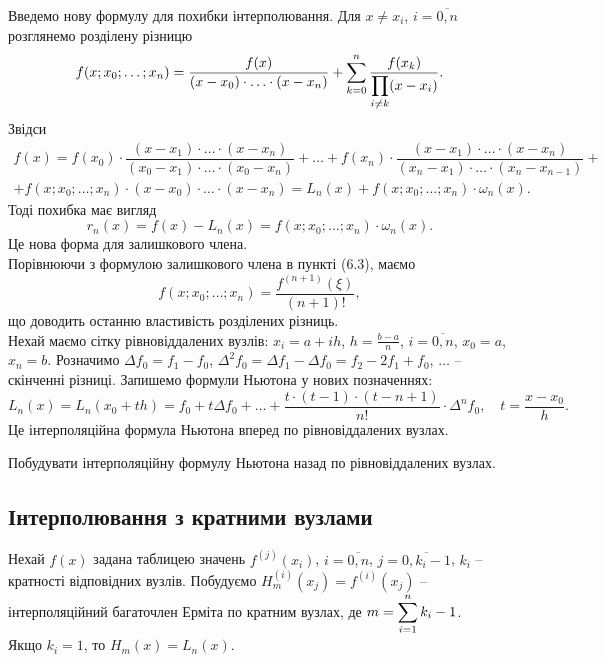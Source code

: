 Введемо нову формулу для похибки інтерполювання. Для $x \ne x_i$, $i = \overline{0,n}$ розглянемо розділену різницю
\[ f(x;x_0;\ldots;x_n) = \dfrac{f(x)}{(x-x_0)\cdot\ldots\cdot(x-x_n)} + \displaystyle\sum\limits_{k=0}^n \dfrac{f(x_k)}{\displaystyle\prod\limits_{i\ne k}(x-x_i)}.\]
Звідси
\begin{multline*}
    f(x) = f(x_0) \cdot \dfrac{(x-x_1)\cdot\ldots\cdot(x-x_n)}{(x_0-x_1)\cdot\ldots\cdot(x_0-x_n)} + \ldots + f(x_n) \cdot \dfrac{(x-x_1)\cdot\ldots\cdot(x-x_n)}{(x_n-x_1)\cdot\ldots\cdot(x_n-x_{n-1})} + \\
    + f(x;x_0;\ldots;x_n)\cdot(x-x_0)\cdot\ldots\cdot(x-x_n)=L_n(x)+f(x;x_0;\ldots;x_n)\cdot\omega_n(x).
\end{multline*}
Тоді похибка має вигляд
\begin{equation}
    \label{eq:6.19}
    r_n(x) = f(x) - L_n(x) = f(x;x_0;\ldots;x_n)\cdot\omega_n(x).
\end{equation}
Це нова форма для залишкового члена.\\

Порівнюючи з формулою залишкового члена в пункті (6.3), маємо
\[ f(x;x_0;\ldots;x_n) = \dfrac{f^{(n+1)}(\xi)}{(n+1)!},\]
що доводить останню властивість розділених різниць. \\

Нехай маємо сітку рівновіддалених вузлів: $x_i = a + i h$, $h = \frac{b-a}{n}$, $i = \overline{0, n}$, $x_0 = a$, $x_n = b$. Розначимо $\Delta f_0 = f_1 - f_0$, $\Delta^2f_0 = \Delta f_1 - \Delta f_0 = f_2 - 2 f_1 + f_0$, $\ldots$ -- скінченні різниці. Запишемо формули Ньютона у нових позначеннях:
\[ L_n(x) = L_n(x_0 + t h) = f_0 + t \Delta f_0 + \ldots + \dfrac{t\cdot(t-1)\cdot(t-n+1)}{n!}\cdot \Delta^n f_0, \quad t = \dfrac{x-x_0}{h}.\]
Це інтерполяційна формула Ньютона вперед по рівновіддалених вузлах.
\begin{problem}
    Побудувати інтерполяційну формулу Ньютона назад по рівновіддалених вузлах.
\end{problem}
\subsection{Інтерполювання з кратними вузлами}
Нехай $f(x)$ задана таблицею значень $f^{(j)}(x_i)$, $i=\overline{0,n}$, $j=\overline{0,k_i-1}$, $k_i$ -- кратності відповідних вузлів. Побудуємо $H_m^{(i)}(x_j) = f^{(i)}(x_j)$ -- інтерполяційний багаточлен Ерміта по кратним вузлах, де $m = \displaystyle\sum\limits_{i=1}^n k_i - 1$. \\

Якщо $k_i=1$, то $H_m(x) = L_n(x)$. \\

